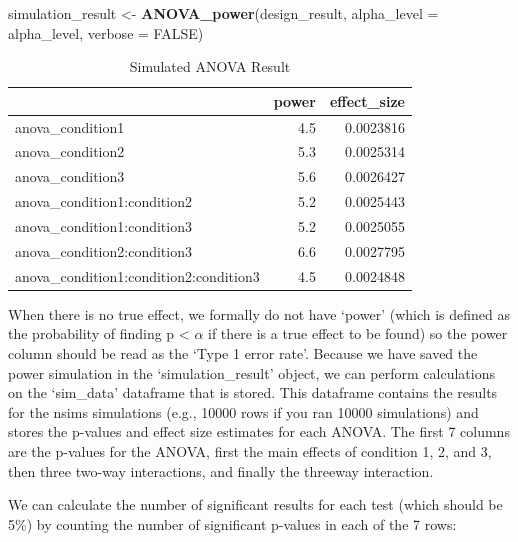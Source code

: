 \documentclass[]{book}
\newenvironment{Shaded}{\begin{snugshade}}{\end{snugshade}}
\newcommand{\DataTypeTok}[1]{\textcolor[rgb]{0.13,0.29,0.53}{#1}}
\newcommand{\KeywordTok}[1]{\textcolor[rgb]{0.13,0.29,0.53}{\textbf{#1}}}
\newcommand{\NormalTok}[1]{#1}
\newcommand{\OtherTok}[1]{\textcolor[rgb]{0.56,0.35,0.01}{#1}}
\newcommand{\StringTok}[1]{\textcolor[rgb]{0.31,0.60,0.02}{#1}}
\begin{document}
\begin{Shaded}
\begin{Highlighting}[]
\NormalTok{simulation_result <-}\StringTok{ }\KeywordTok{ANOVA_power}\NormalTok{(design_result,}
                                 \DataTypeTok{alpha_level =}\NormalTok{ alpha_level,}
                                 \DataTypeTok{verbose =} \OtherTok{FALSE}\NormalTok{)}
\end{Highlighting}
\end{Shaded}

\begin{table}[t]

\caption{\label{tab:unnamed-chunk-239}Simulated ANOVA Result}
\centering
\begin{tabular}{l|r|r}
\hline
  & power & effect\_size\\
\hline
anova\_condition1 & 4.5 & 0.0023816\\
\hline
anova\_condition2 & 5.3 & 0.0025314\\
\hline
anova\_condition3 & 5.6 & 0.0026427\\
\hline
anova\_condition1:condition2 & 5.2 & 0.0025443\\
\hline
anova\_condition1:condition3 & 5.2 & 0.0025055\\
\hline
anova\_condition2:condition3 & 6.6 & 0.0027795\\
\hline
anova\_condition1:condition2:condition3 & 4.5 & 0.0024848\\
\hline
\end{tabular}
\end{table}

When there is no true effect, we formally do not have `power' (which is defined as the probability of finding p \textless{} \(\alpha\) if there is a true effect to be found) so the power column should be read as the `Type 1 error rate'. Because we have saved the power simulation in the `simulation\_result' object, we can perform calculations on the `sim\_data' dataframe that is stored. This dataframe contains the results for the nsims simulations (e.g., 10000 rows if you ran 10000 simulations) and stores the p-values and effect size estimates for each ANOVA. The first 7 columns are the p-values for the ANOVA, first the main effects of condition 1, 2, and 3, then three two-way interactions, and finally the threeway interaction.

We can calculate the number of significant results for each test (which should be 5\%) by counting the number of significant p-values in each of the 7 rows:
\end{document}
